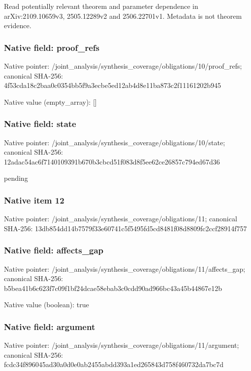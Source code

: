 \documentclass[10pt,a4paper]{article}
\begin{document}
\begingroup\raggedright\sloppy Read potentially relevant theorem and parameter dependence in arXiv:\allowbreak{}2109.10659v3,\allowbreak{} 2505.12289v2 and 2506.22701v1. Metadata is not theorem evidence.\par\endgroup

\subsubsection{Native field: proof\_\allowbreak{}refs}
Native pointer: /joint\_\allowbreak{}analysis/synthesis\_\allowbreak{}coverage/obligations/10/proof\_\allowbreak{}refs; canonical SHA-256: 4f53cda18c2baa0c0354bb5f9a3ecbe5ed12ab4d8e11ba873c2f11161202b945

Native value (empty\_\allowbreak{}array): []

\subsubsection{Native field: state}
Native pointer: /joint\_\allowbreak{}analysis/synthesis\_\allowbreak{}coverage/obligations/10/state; canonical SHA-256: 12adac54ac6f7140109391b670b3cbcd51f083d8f5ee62ce26857c794ed67d36

\begingroup\raggedright\sloppy pending\par\endgroup

\subsubsection{Native item 12}
Native pointer: /joint\_\allowbreak{}analysis/synthesis\_\allowbreak{}coverage/obligations/11; canonical SHA-256: 13db854dd14b7579f33e60741c5f5495fd5cd8481f08d8809fc2ccf28914f757

\subsubsection{Native field: affects\_\allowbreak{}gap}
Native pointer: /joint\_\allowbreak{}analysis/synthesis\_\allowbreak{}coverage/obligations/11/affects\_\allowbreak{}gap; canonical SHA-256: b5bea41b6c623f7c09f1bf24dcae58ebab3c0cdd90ad966bc43a45b44867e12b

Native value (boolean): true

\subsubsection{Native field: argument}
Native pointer: /joint\_\allowbreak{}analysis/synthesis\_\allowbreak{}coverage/obligations/11/argument; canonical SHA-256: fcdc34f896045ad30a0d0e0ab2455abdd393a1ed265843d758f460732da7bc7d
\end{document}
